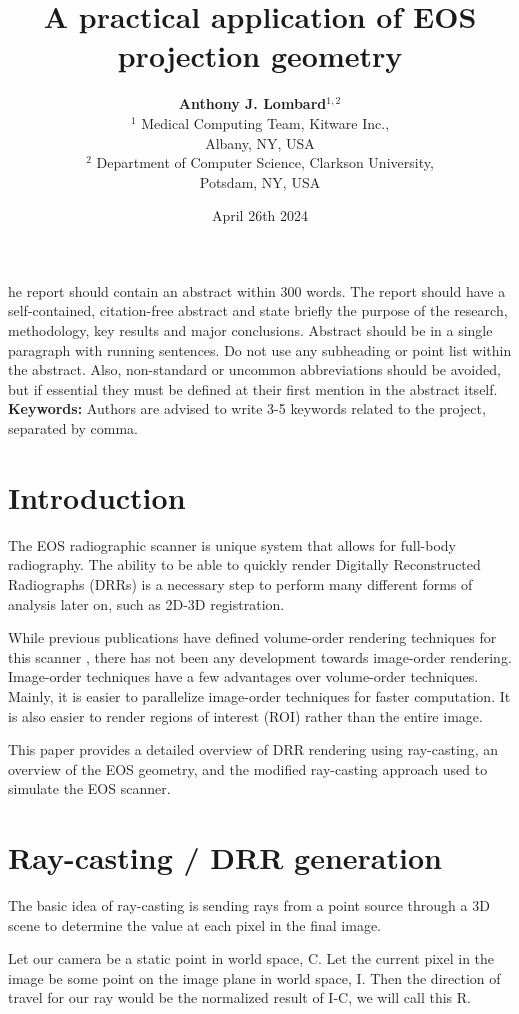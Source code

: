 \documentclass[12pt,twocolumn]{article}
\title{\bf \Huge A practical application of EOS\textregistered{} projection geometry}
\author{{\bf \Large Anthony J. Lombard$^{1,2}$}\\
  $^1$ Medical Computing Team, Kitware Inc.,\\
  Albany, NY, USA\\
  $^2$ Department of Computer Science, Clarkson University,\\ 
  Potsdam, NY, USA
  }
\date{April 26th 2024}
\begin{document}
\maketitle

he report should contain an abstract within 300 words. The report should have a self-contained, citation-free abstract and state briefly the purpose of the research, methodology, key results and major conclusions. Abstract should be in a single paragraph with running sentences. Do not use any subheading or point list within the abstract. Also, non-standard or uncommon abbreviations should be avoided, but if essential they must be defined at their first mention in the abstract itself.  
\noindent
{\bf Keywords:} Authors are advised to write 3-5 keywords related to the project, separated by comma. 

\section{Introduction}

The EOS\textregistered{} radiographic scanner is unique system that allows for full-body radiography. 
The ability to be able to quickly render Digitally Reconstructed Radiographs (DRRs) is a necessary step to perform
many different forms of analysis later on, such as 2D-3D registration. 

While previous publications have defined volume-order rendering techniques for this scanner \cite{groisser2019geometry},
there has not been any development towards image-order rendering. Image-order techniques have a few advantages over 
volume-order techniques. Mainly, it is easier to parallelize image-order techniques for faster computation. It is also 
easier to render regions of interest (ROI) rather than the entire image.

This paper provides a detailed overview of DRR rendering using ray-casting, an overview of the EOS\textregistered{} 
geometry, and the modified ray-casting approach used to simulate the EOS\textregistered{} scanner.

\section{Ray-casting / DRR generation}
The basic idea of ray-casting is sending rays from a point source through a 3D scene to determine the value at each 
pixel in the final image. 

Let our camera be a static point in world space, C. 
Let the current pixel in the image be some point on the image plane in world space, I. 
Then the direction of travel for our ray would be the normalized result of I-C, we will call this R.
\end{document}
